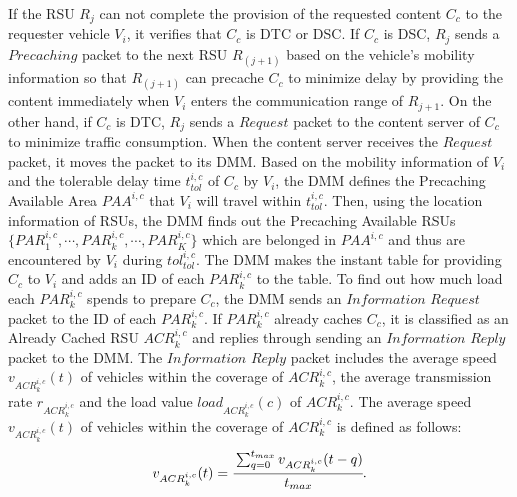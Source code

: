 \documentclass{ieeeaccess}
\begin{document}
If the RSU $R_{j}$ can not complete the provision of the requested content $C_{c}$ to the requester vehicle $V_{i}$, it verifies that $C_{c}$ is DTC or DSC.
If $C_{c}$ is DSC, $R_{j}$ sends a $Precaching$ packet to the next RSU $R_{(j+1)}$ based on the vehicle's mobility information so that $R_{(j+1)}$ can precache $C_{c}$ to minimize delay by providing the content immediately when $V_{i}$ enters the communication range of $R_{j+1}$. 
On the other hand, if $C_{c}$ is DTC, $R_{j}$ sends a $Request$ packet to the content server of $C_{c}$ to minimize traffic consumption.
When the content server receives the $Request$ packet, it moves the packet to its DMM.
Based on the mobility information of $V_{i}$ and the tolerable delay time $t^{i,c}_{tol}$ of $C_{c}$ by $V_{i}$, the DMM defines the Precaching Available Area $PAA^{i,c}$ that $V_{i}$ will travel within $t^{i,c}_{tol}$.
Then, using the location information of RSUs, the DMM finds out the Precaching Available RSUs $\{PAR^{i,c}_{1}, \cdots, PAR^{i,c}_{k}, \cdots, PAR^{i,c}_{K}\}$ which are belonged in $PAA^{i,c}$ and thus are encountered by $V_{i}$ during $tol^{i,c}_{tol}$.
The DMM makes the instant table for providing $C_{c}$ to $V_{i}$ and adds an ID of each $PAR^{i,c}_{k}$ to the table.
To find out how much load each $PAR^{i,c}_{k}$ spends to prepare $C_{c}$, the DMM sends an $Information$ $Request$ packet to the ID of each $PAR^{i,c}_{k}$.
If $PAR^{i,c}_{k}$ already caches $C_{c}$, it is classified as an Already Cached RSU $ACR^{i,c}_{k}$ and replies through sending an $Information$ $Reply$ packet to the DMM.
The $Information$ $Reply$ packet includes the average speed $v_{ACR^{i,c}_{k}}(t)$ of vehicles within the coverage of $ACR^{i,c}_{k}$, the average transmission rate $r_{ACR^{i,c}_{k}}$ and the load value $load_{ACR^{i,c}_{k}}(c)$ of $ACR^{i,c}_{k}$.
The average speed $v_{ACR^{i,c}_{k}}(t)$ of vehicles within the coverage of $ACR^{i,c}_{k}$ is defined as follows:
\begin{equation}
    v_{ACR^{i,c}_{k}}(t) = \cfrac{\sum_{q=0}^{t_{max}}v_{ACR^{i,c}_{k}}(t-q)}{t_{max}}.   \label{eq2}
\end{equation}
\end{document}
